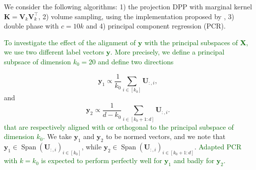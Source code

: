 \documentclass[twoside,11pt]{book}
\newcommand{\rev}[1]{\textcolor{darkgreen}{#1}}
\numberwithin{theorem}{chapter}
\numberwithin{definition}{chapter}
\numberwithin{proposition}{chapter}
\numberwithin{corollary}{chapter}
\numberwithin{example}{chapter}
\numberwithin{lemma}{chapter}
\DeclareMathOperator{\Span}{\mathrm{Span}}
\DeclareMathOperator{\Tran}{\intercal}
\begin{document}
We consider the following algorithms: 1) the projection DPP with marginal kernel $\bm{K}=\bm{V}_{k}^{}\bm{V}_{k}^{\Tran}$, 2) volume sampling, using the implementation proposed by \cite{KuTa11}, 3) double phase with $c = 10k$ and 4) principal component regression (PCR).

\rev{To investigate the effect of the alignment of $\mathbf{y}$ with the principal subspaces of $\bm{X}$, we use two different label vectors $\mathbf{y}$. More precisely, we define a principal subpsace of dimension $k_0 = 20$ and define two directions}

\begin{equation}
\mathbf{y}_{1} \propto \frac{1}{k_0} \sum\limits_{i \in [k_0]} \bm{U}_{:,i},
\end{equation}
 and
\begin{equation}
\mathbf{y}_{2} \propto \frac{1}{d-k_0} \sum\limits_{i \in [k_0+1:d]} \bm{U}_{:,i}.
\end{equation}
\rev{that are respectively aligned with or orthogonal to the principal subspace of dimension $k_0$.}
We take $\mathbf{y}_{1}$ and $\mathbf{y}_{2}$ to be normed vectors, and we note that $\mathbf{y}_{1} \in \Span (\bm{U}_{:,i})_{i \in [k_0]}$, while $\mathbf{y}_{2} \in \Span (\bm{U}_{:,i})_{i \in [k_0+1:d]}$. \rev{Adapted PCR with $k=k_0$ is expected to perform perfectly well for $\mathbf{y}_{1}$ and badly for $\mathbf{y}_{2}$.}

\end{document}
